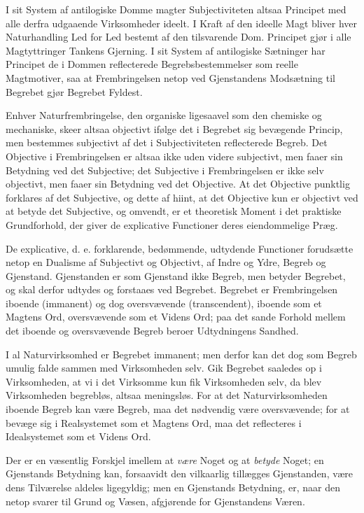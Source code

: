 \documentclass[12pt]{book}
\newcommand{\opage}[1]{\marginnote{\footnotesize\textit{[#1]}}}
\begin{document}
I sit System af antilogiske Domme magter Subjectiviteten
altsaa Principet med alle derfra udgaaende Virksomheder
ideelt. I Kraft af den ideelle Magt bliver hver Naturhandling
Led for Led bestemt af den tilsvarende Dom. Principet
gjør i alle Magtyttringer Tankens Gjerning. I sit System
af antilogiske Sætninger har Principet de i Dommen reflecterede
Begrebsbestemmelser som reelle Magtmotiver, saa at
Frembringelsen netop ved Gjenstandens Modsætning til Begrebet
gjør Begrebet Fyldest.

Enhver Naturfrembringelse, den organiske ligesaavel som
den chemiske og mechaniske, skeer altsaa objectivt ifølge det i
Begrebet sig bevægende Princip, men bestemmes subjectivt af det
i Subjectiviteten reflecterede Begreb. Det Objective i Frembringelsen
er altsaa ikke uden videre subjectivt, men faaer sin
Betydning ved det Subjective; det Subjective i Frembringelsen
er ikke selv objectivt, men faaer sin Betydning ved det Objective.
At det Objective punktlig forklares af det Subjective,
og dette af hiint, at det Objective kun er objectivt ved at betyde
det Subjective, og omvendt, er et theoretisk Moment i
det praktiske Grundforhold, der giver de explicative Functioner
deres eiendommelige Præg.

De explicative, d. e. forklarende, bedømmende, udtydende
Functioner forudsætte netop en Dualisme af Subjectivt og
Objectivt, af Indre og Ydre, Begreb og Gjenstand. Gjenstanden
er som Gjenstand ikke Begreb, men betyder Begrebet,
og skal derfor udtydes og forstaaes ved Begrebet. Begrebet
er Frembringelsen iboende (immanent) og dog oversvævende
\opage{144}(transcendent), iboende som et Magtens Ord, oversvævende
som et Videns Ord; paa det sande Forhold mellem det
iboende og oversvævende Begreb beroer Udtydningens Sandhed.

I al Naturvirksomhed er Begrebet immanent; men derfor
kan det dog som Begreb umulig falde sammen med Virksomheden
selv. Gik Begrebet saaledes op i Virksomheden, at
vi i det Virksomme kun fik Virksomheden selv, da blev Virksomheden
begrebløs, altsaa meningsløs. For at det Naturvirksomheden
iboende Begreb kan være Begreb, maa det nødvendig
være oversvævende; for at bevæge sig i Realsystemet
som et Magtens Ord, maa det reflecteres i Idealsystemet som
et Videns Ord.

Der er en væsentlig Forskjel imellem at \emph{være} Noget
og at \emph{betyde} Noget; en Gjenstands Betydning kan, forsaavidt
den vilkaarlig tillægges Gjenstanden, være dens Tilværelse
aldeles ligegyldig; men en Gjenstands Betydning, er,
naar den netop svarer til Grund og Væsen, afgjørende for
Gjenstandens Væren.
\end{document}

